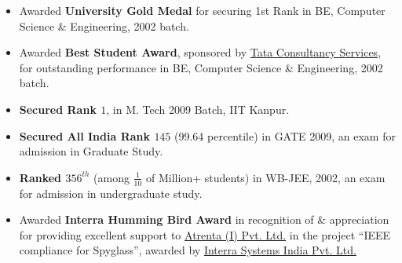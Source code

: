\documentclass[9pt]{article}
\newenvironment{changemargin}[2]{%
  \begin{list}{}{%
    \setlength{\topsep}{0pt}%
    \setlength{\leftmargin}{#1}%
    \setlength{\rightmargin}{#2}%
    \setlength{\listparindent}{\parindent}%
    \setlength{\itemindent}{\parindent}%
    \setlength{\parsep}{\parskip}%
  }%
  \item[]}{\end{list}
}
\newenvironment{body} {
	\vspace*{-16pt}
	\begin{changemargin}{-0.25in}{-0.5in}
  }	
	{\end{changemargin}
}
\begin{document}
\begin{body}
	\vspace{14pt}
	\begin{itemize} \itemsep -0pt  %
		\item Awarded \textbf{University Gold Medal} for securing 1st Rank in BE, Computer Science \& Engineering, 2002 batch.\\
		\item Awarded \textbf{Best Student Award}, sponsored by \href{http://www.tcs.com}{Tata Consultancy Services}, for outstanding performance in BE, Computer Science \& Engineering, 2002 batch. \\
		\item \textbf{Secured Rank $1$}, in M. Tech 2009 Batch, IIT Kanpur.
		\item \textbf{Secured All India Rank $145$} (99.64 percentile) in GATE 2009, an exam for admission in Graduate Study.
		\item \textbf{Ranked $356^{th}$} (among $\frac{1}{10}$ of Million+ students) in WB-JEE, 2002, an exam for admission in undergraduate study.
		\item Awarded \textbf{Interra Humming Bird Award} in recognition of \& appreciation for providing excellent support to \href{}{Atrenta (I) Pvt. Ltd.} in the project ``IEEE compliance for Spyglass'', awarded by \href{http://www.interrasystems.com/}{Interra Systems India Pvt. Ltd.} 
	\end{itemize} 
\end{body}

\smallskip
\end{document}
